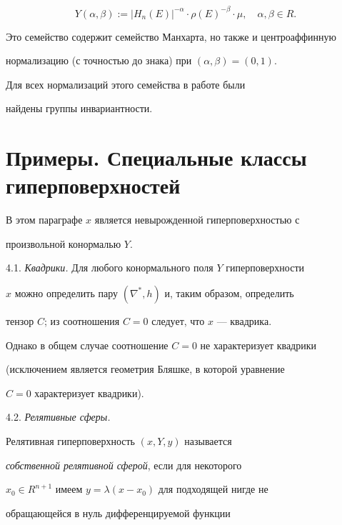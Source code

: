 $$


Y(\alpha, \beta):= |H_n(E)|^{- \alpha} \cdot \rho


(E)^{-\beta} \cdot \mu, \quad \alpha, \beta \in R.


$$


Это семейство содержит семейство Манхарта, но также и центроаффинную


нормализацию (с точностью до знака) при $(\alpha, \beta) = (0,1)$.


Для всех нормализаций этого семейства в работе \cite{BIN-W} были


найдены группы инвариантности.








\section{Примеры. Специальные классы гиперповерхностей}





В этом параграфе $x$ является невырожденной гиперповерхностью с


произвольной конормалью $Y$.


\medskip





4.1. {\it Квадрики.} Для любого конормального поля $Y$ гиперповерхности


$x$ можно определить пару $(\nabla^*,h)$ и, таким образом, определить


тензор $C$; из соотношения $C=0$ следует, что $x$ --- квадрика.


Однако в общем случае соотношение $C=0$ не характеризует квадрики


(исключением является геометрия Бляшке, в которой уравнение


$C=0$ характеризует квадрики).


\medskip





4.2. {\it Релятивные сферы.}


Релятивная гиперповерхность $(x,Y,y)$ называется


{\it собственной релятивной сферой}, если для некоторого


$x_0 \in R^{n+1}$ имеем $y=\lambda (x-x_0)$ для подходящей нигде не


обращающейся в нуль дифференцируемой функции



